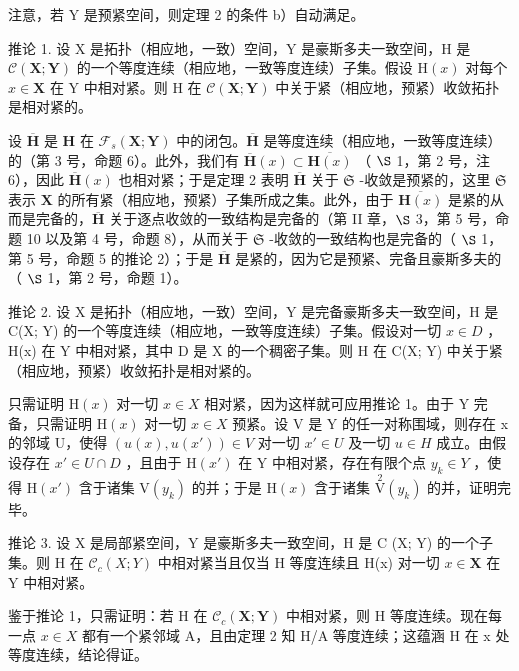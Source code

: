 注意，若 Y 是预紧空间，则定理 2 的条件 b）自动满足。

推论 1. 设 X 是拓扑（相应地，一致）空间，Y 是豪斯多夫一致空间，H 是 \(\mathcal{C}(\mathbf{X};\mathbf{Y})\) 的一个等度连续（相应地，一致等度连续）子集。假设 \(\mathrm{H}(x)\) 对每个 \(x\in \mathbf{X}\) 在 Y 中相对紧。则 H 在 \(\mathcal{C}(\mathbf{X};\mathbf{Y})\) 中关于紧（相应地，预紧）收敛拓扑是相对紧的。

设 \(\overline{\mathbf{H}}\) 是 \(\mathbf{H}\) 在 \(\mathcal{F}_s(\mathbf{X};\mathbf{Y})\) 中的闭包。\(\overline{\mathbf{H}}\) 是等度连续（相应地，一致等度连续）的（第 3 号，命题 6）。此外，我们有 \(\overline{\mathbf{H}}(x)\subset \overline{\mathbf{H}(x)}\) （ \(\S\) 1，第 2 号，注 6），因此 \(\overline{\mathbf{H}}(x)\) 也相对紧；于是定理 2 表明 \(\overline{\mathbf{H}}\) 关于 \(\mathfrak{S}\) -收敛是预紧的，这里 \(\mathfrak{S}\) 表示 \(\mathbf{X}\) 的所有紧（相应地，预紧）子集所成之集。此外，由于 \(\overline{\mathbf{H}(x)}\) 是紧的从而是完备的，\(\overline{\mathbf{H}}\) 关于逐点收敛的一致结构是完备的（第 II 章，\(\S\) 3，第 5 号，命题 10 以及第 4 号，命题 8），从而关于 \(\mathfrak{S}\) -收敛的一致结构也是完备的（ \(\S\) 1，第 5 号，命题 5 的推论 2）；于是 \(\overline{\mathbf{H}}\) 是紧的，因为它是预紧、完备且豪斯多夫的（ \(\S\) 1，第 2 号，命题 1）。

推论 2. 设 X 是拓扑（相应地，一致）空间，Y 是完备豪斯多夫一致空间，H 是 C(X; Y) 的一个等度连续（相应地，一致等度连续）子集。假设对一切 \(x \in D\) ，H(x) 在 Y 中相对紧，其中 D 是 X 的一个稠密子集。则 H 在 C(X; Y) 中关于紧（相应地，预紧）收敛拓扑是相对紧的。

只需证明 \(\mathrm{H}(x)\) 对一切 \(x \in X\) 相对紧，因为这样就可应用推论 1。由于 Y 完备，只需证明 \(\mathrm{H}(x)\) 对一切 \(x \in X\) 预紧。设 V 是 Y 的任一对称围域，则存在 x 的邻域 U，使得 \((u(x), u(x')) \in V\) 对一切 \(x' \in U\) 及一切 \(u \in H\) 成立。由假设存在 \(x' \in U \cap D\) ，且由于 \(\mathrm{H}(x')\) 在 Y 中相对紧，存在有限个点 \(y_k \in Y\) ，使得 \(\mathrm{H}(x')\) 含于诸集 \(\mathrm{V}(y_k)\) 的并；于是 \(\mathrm{H}(x)\) 含于诸集 \(\overset{2}{\mathrm{V}}(y_k)\) 的并，证明完毕。

推论 3. 设 X 是局部紧空间，Y 是豪斯多夫一致空间，H 是 C (X; Y) 的一个子集。则 H 在 \(\mathcal{C}_c(X; Y)\) 中相对紧当且仅当 H 等度连续且 H(x) 对一切 \(x \in \mathbf{X}\) 在 Y 中相对紧。

鉴于推论 1，只需证明：若 H 在 \(\mathcal{C}_{c}(\mathbf{X};\mathbf{Y})\) 中相对紧，则 H 等度连续。现在每一点 \(x\in X\) 都有一个紧邻域 A，且由定理 2 知 H/A 等度连续；这蕴涵 H 在 x 处等度连续，结论得证。

